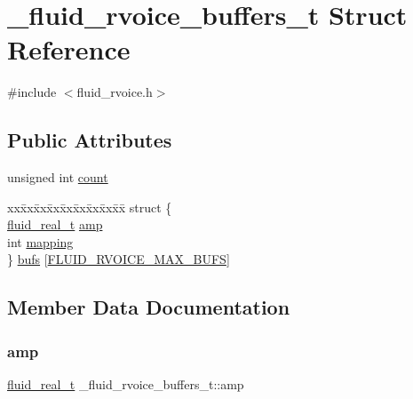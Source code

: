 \hypertarget{struct__fluid__rvoice__buffers__t}{}\section{\+\_\+fluid\+\_\+rvoice\+\_\+buffers\+\_\+t Struct Reference}
\label{struct__fluid__rvoice__buffers__t}


{\ttfamily \#include $<$fluid\+\_\+rvoice.\+h$>$}

\subsection*{Public Attributes}
\begin{DoxyCompactItemize}
\item 
unsigned int \hyperlink{struct__fluid__rvoice__buffers__t_a1e1a22dc9c43ac0a62e79b7a12d88716}{count}
\item 
\begin{tabbing}
xx\=xx\=xx\=xx\=xx\=xx\=xx\=xx\=xx\=\kill
struct \{\\
\>\hyperlink{fluidsynth__priv_8h_a9e96f0917747b69cabb7c671bc693dbb}{fluid\_real\_t} \hyperlink{struct__fluid__rvoice__buffers__t_afd03db7fb66e15021affe424c41738ef}{amp}\\
\>int \hyperlink{struct__fluid__rvoice__buffers__t_ab95a357279a79aa90127f4f31acb9db1}{mapping}\\
\} \hyperlink{struct__fluid__rvoice__buffers__t_ac47ccb3ce4c005c99af117932c8b28a1}{bufs} \mbox{[}\hyperlink{fluid__rvoice_8h_acf3b2a54d9a8dfe8d9f0db8dae37c831}{FLUID\_RVOICE\_MAX\_BUFS}\mbox{]}\\

\end{tabbing}\end{DoxyCompactItemize}


\subsection{Member Data Documentation}
\mbox{\label{struct__fluid__rvoice__buffers__t_afd03db7fb66e15021affe424c41738ef}} 
\subsubsection{\texorpdfstring{amp}{amp}}
{\footnotesize\ttfamily \hyperlink{fluidsynth__priv_8h_a9e96f0917747b69cabb7c671bc693dbb}{fluid\+\_\+real\+\_\+t} \+\_\+fluid\+\_\+rvoice\+\_\+buffers\+\_\+t\+::amp}

